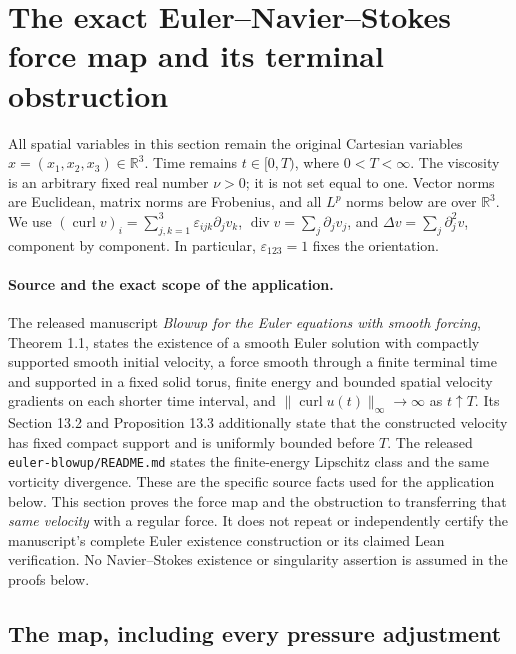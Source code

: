 \section{The exact Euler--Navier--Stokes force map and its terminal obstruction}
\label{sec:euler-viscosity-bridge}

All spatial variables in this section remain the original Cartesian variables
$x=(x_1,x_2,x_3)\in\mathbb R^3$.  Time remains $t\in[0,T)$, where
$0<T<\infty$.  The viscosity is an arbitrary fixed real number $\nu>0$;
it is not set equal to one.  Vector norms are Euclidean, matrix norms are
Frobenius, and all $L^p$ norms below are over $\mathbb R^3$.  We use
$(\operatorname{curl}v)_i=\sum_{j,k=1}^3\varepsilon_{ijk}\partial_jv_k$,
$\operatorname{div}v=\sum_j\partial_jv_j$, and
$\Delta v=\sum_j\partial_j^2v$, component by component.  In particular,
$\varepsilon_{123}=1$ fixes the orientation.

\paragraph{Source and the exact scope of the application.}
The released manuscript \emph{Blowup for the Euler equations with smooth
forcing}, Theorem 1.1, states the existence of a smooth Euler solution with
compactly supported smooth initial velocity, a force smooth through a finite
terminal time and supported in a fixed solid torus, finite energy and bounded
spatial velocity gradients on each shorter time interval, and
$\|\operatorname{curl}u(t)\|_\infty\longrightarrow\infty$ as $t\uparrow T$.
Its Section 13.2 and Proposition 13.3 additionally state that the constructed
velocity has fixed compact support and is uniformly bounded before $T$.
The released \texttt{euler-blowup/README.md} states the finite-energy Lipschitz
class and the same vorticity divergence.  These are the specific source facts
used for the application below.  This section proves the force map and the
obstruction to transferring that \emph{same velocity} with a regular force.
It does not repeat or independently certify the manuscript's complete Euler
existence construction or its claimed Lean verification.  No Navier--Stokes
existence or singularity assertion is assumed in the proofs below.

\subsection{The map, including every pressure adjustment}

